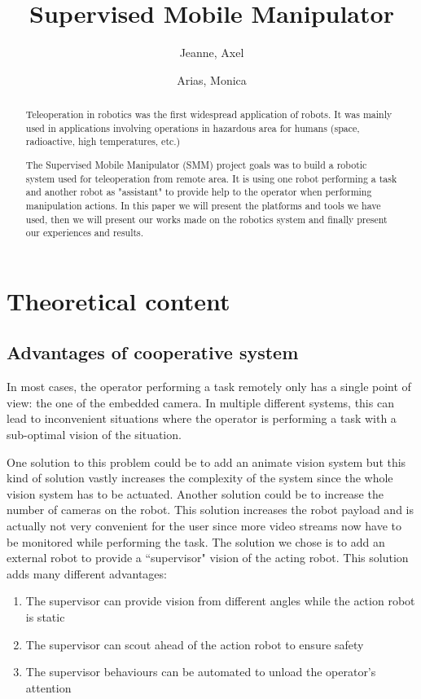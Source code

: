 \documentclass[11pt,a4paper,twocolumn]{article}
\begin{document}
\pagestyle{plain}
\author{Jeanne, Axel \and Arias, Monica}
\title{Supervised Mobile Manipulator}
\maketitle
\begin{abstract}
Teleoperation in robotics was the first widespread application of robots. 
It was mainly used in applications involving operations in hazardous area for humans (space, 
radioactive, high temperatures, etc.)

The Supervised Mobile Manipulator (SMM) project goals was to build a robotic system used for
teleoperation from remote area. It is using one robot performing a task and another robot as 
"assistant" to provide help to the operator when performing manipulation actions.
In this paper we will present the platforms and tools we have used, then we will present our
works made on the robotics system and finally present our experiences and results.
\end{abstract}
\clearpage
\tableofcontents
\clearpage
\section{Theoretical content}
\subsection{Advantages of cooperative system}
In most cases, the operator performing a task remotely only has a single point of view: the
one of the embedded camera. In multiple different systems, this can
lead to inconvenient situations where the operator is performing a task with a sub-optimal
vision of the situation.

One solution to this problem could be to add an animate vision system \cite{Ballard1991}
but this kind of solution vastly increases the complexity of the system since the whole vision system
has to be actuated. Another solution could be to increase the number of cameras on the robot.
This solution increases the robot payload and is actually not very convenient for the user
since more video streams now have to be monitored while performing the task. The solution we chose is to add an external robot to provide a ``supervisor" vision of the acting robot. This solution adds many different  advantages:

\begin{enumerate}
\item The supervisor can provide vision from different angles while the action robot is static
\item The supervisor can scout ahead of the action robot to ensure safety
\item The supervisor behaviours can be automated to unload the operator's attention
\end{enumerate}
\end{document}
